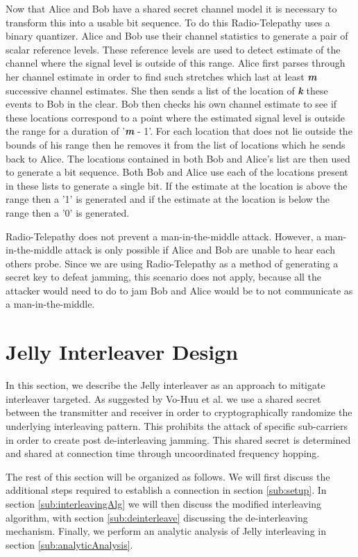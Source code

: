 \documentclass[sigconf, anonymous]{acmart}
\begin{document}
Now that Alice and Bob have a shared secret channel model it is necessary to transform this into a usable bit sequence. To do this Radio-Telepathy uses a binary quantizer. Alice and Bob use their channel statistics to generate a pair of scalar reference levels. These reference levels are used to detect estimate of the channel where the signal level is outside of this range. Alice first parses through her channel estimate in order to find such stretches which last at least \textbf{\textit{m}} successive channel estimates. She then sends a list of the location of \textbf{\textit{k}} these events to Bob in the clear. Bob then checks his own channel estimate to see if these locations correspond to a point where the estimated signal level is outside the range for a duration of '\textbf{\textit{m}} - 1'. For each location that does not lie outside the bounds of his range then he removes it from the list of locations which he sends back to Alice. The locations contained in both Bob and Alice's list are then used to generate a bit sequence. Both Bob and Alice use each of the locations present in these lists to generate a single bit. If the estimate at the location is above the range then a '1' is generated and if the estimate at the location is below the range then a '0' is generated.

Radio-Telepathy does not prevent a man-in-the-middle attack. However, a man-in-the-middle attack is only possible if Alice and Bob are unable to hear each others probe. Since we are using Radio-Telepathy as a method of generating a secret key to defeat jamming, this scenario does not apply, because all the attacker would need to do to jam Bob and Alice would be to not communicate as a man-in-the-middle.

\section{Jelly Interleaver Design}
\label{sec:interleaver_design}

In this section, we describe the Jelly interleaver as an approach to mitigate interleaver targeted. As suggested by Vo-Huu et al. we use a shared secret between the transmitter and receiver in order to cryptographically randomize the underlying interleaving pattern\cite{vo2016interleaving}. This prohibits the attack of specific sub-carriers in order to create post de-interleaving jamming. This shared secret is determined and shared at connection time through uncoordinated frequency hopping. 

The rest of this section will be organized as follows. We will first discuss the additional steps required to establish a connection in section \ref{sub:setup}. In section \ref{sub:interleavingAlg} we will then discuss the modified interleaving algorithm, with section \ref{sub:deinterleave} discussing the de-interleaving mechanism. Finally, we perform an analytic analysis of Jelly interleaving in section \ref{sub:analyticAnalysis}.
\end{document}
